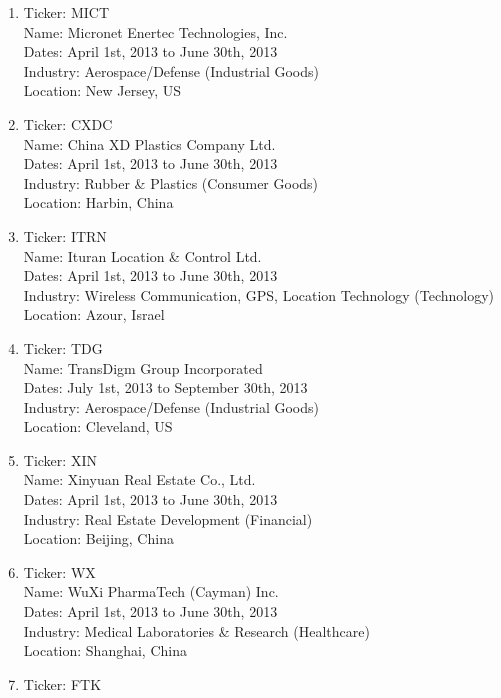 \documentclass[preprint,12pt]{elsarticle}
\begin{document}
\begin{enumerate}
	\item Ticker: MICT \\
  		Name: Micronet Enertec Technologies, Inc. \\
        Dates: April 1st, 2013 to June 30th, 2013 \\ 
        Industry: Aerospace/Defense (Industrial Goods)\\
        Location: New Jersey, US
    \item Ticker: CXDC \\
    	Name: China XD Plastics Company Ltd. \\
        Dates: April 1st, 2013 to June 30th, 2013 \\ 
        Industry: Rubber \& Plastics (Consumer Goods)\\
        Location: Harbin, China
    \item Ticker: ITRN \\
    	Name: Ituran Location \& Control Ltd. \\
        Dates: April 1st, 2013 to June 30th, 2013 \\
        Industry: Wireless Communication, GPS, Location Technology (Technology)\\
        Location: Azour, Israel
    \item Ticker: TDG \\ 
    	Name: TransDigm Group Incorporated \\
        Dates: July 1st, 2013 to  September 30th, 2013 \\
        Industry: Aerospace/Defense (Industrial Goods) \\ 
        Location: Cleveland, US
    \item Ticker: XIN \\
    	Name: Xinyuan Real Estate Co., Ltd. \\
        Dates: April 1st, 2013 to June 30th, 2013 \\
        Industry: Real Estate Development (Financial) \\ 
        Location: Beijing, China
    \item Ticker: WX \\ 
    	Name: WuXi PharmaTech (Cayman) Inc. \\
        Dates: April 1st, 2013 to June 30th, 2013 \\
        Industry: Medical Laboratories \& Research (Healthcare) \\ 
        Location: Shanghai, China
    \item Ticker: FTK \\

\end{enumerate}
\end{document}
